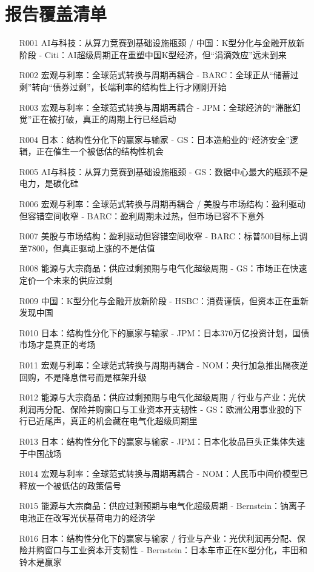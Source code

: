 \documentclass[11pt]{ctexart}
\begin{document}
\section{报告覆盖清单}
\begin{itemize}
  \item [R001] AI与科技：从算力竞赛到基础设施瓶颈 / 中国：K型分化与金融开放新阶段 - Citi：AI超级周期正在重塑中国K型经济，但“涓滴效应”远未到来
  \item [R002] 宏观与利率：全球范式转换与周期再耦合 - BARC：全球正从“储蓄过剩”转向“债券过剩”，长端利率的结构性上行才刚刚开始
  \item [R003] 宏观与利率：全球范式转换与周期再耦合 - JPM：全球经济的“滞胀幻觉”正在被打破，真正的周期上行已经启动
  \item [R004] 日本：结构性分化下的赢家与输家 - GS：日本造船业的“经济安全”逻辑，正在催生一个被低估的结构性机会
  \item [R005] AI与科技：从算力竞赛到基础设施瓶颈 - GS：数据中心最大的瓶颈不是电力，是碳化硅
  \item [R006] 宏观与利率：全球范式转换与周期再耦合 / 美股与市场结构：盈利驱动但容错空间收窄 - BARC：盈利周期未过热，但市场已容不下意外
  \item [R007] 美股与市场结构：盈利驱动但容错空间收窄 - BARC：标普500目标上调至7800，但真正驱动上涨的不是估值
  \item [R008] 能源与大宗商品：供应过剩预期与电气化超级周期 - GS：市场正在快速定价一个未来的供应过剩
  \item [R009] 中国：K型分化与金融开放新阶段 - HSBC：消费谨慎，但资本正在重新发现中国
  \item [R010] 日本：结构性分化下的赢家与输家 - JPM：日本370万亿投资计划，国债市场才是真正的考场
  \item [R011] 宏观与利率：全球范式转换与周期再耦合 - NOM：央行加急推出隔夜逆回购，不是降息信号而是框架升级
  \item [R012] 能源与大宗商品：供应过剩预期与电气化超级周期 / 行业与产业：光伏利润再分配、保险并购窗口与工业资本开支韧性 - GS：欧洲公用事业股的下行已近尾声，真正的机会藏在电气化超级周期里
  \item [R013] 日本：结构性分化下的赢家与输家 - JPM：日本化妆品巨头正集体失速于中国战场
  \item [R014] 宏观与利率：全球范式转换与周期再耦合 - NOM：人民币中间价模型已释放一个被低估的政策信号
  \item [R015] 能源与大宗商品：供应过剩预期与电气化超级周期 - Bernstein：钠离子电池正在改写光伏基荷电力的经济学
  \item [R016] 日本：结构性分化下的赢家与输家 / 行业与产业：光伏利润再分配、保险并购窗口与工业资本开支韧性 - Bernstein：日本车市正在K型分化，丰田和铃木是赢家

\end{itemize}
\end{document}
